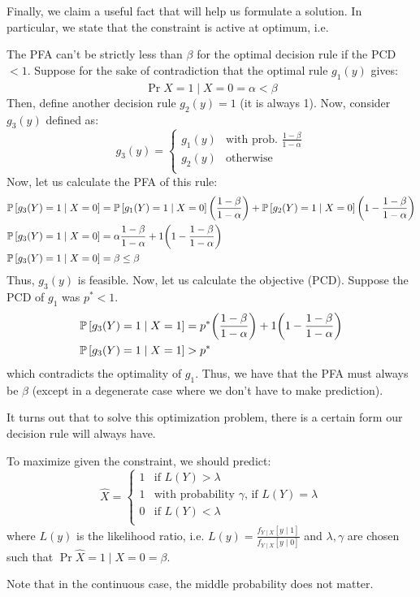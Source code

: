 Finally, we claim a useful fact that will help us formulate a solution. In particular, we state that the constraint is active at optimum, i.e.
\begin{theorem}
    The PFA can't be strictly less than $\beta$ for the optimal decision rule if the PCD $< 1$.
    Suppose for the sake of contradiction that the optimal rule $g_1(y)$ gives:
    \[ \Pr{\hat{X} = 1 \mid X = 0} = \alpha < \beta \]
    Then, define another decision rule $g_2(y) = 1$ (it is always 1). Now, consider $g_3(y)$ defined as:
    \[ g_3(y) = \begin{cases}
        g_1(y) & \text{with prob. $\frac{1 - \beta}{1 - \alpha}$} \\
        g_2(y) & \text{otherwise} \\
    \end{cases} \]
    Now, let us calculate the PFA of this rule:
    \begin{align*}
        \mathbb{P}\left[ g_3(Y) = 1 \mid X = 0 \right] &= \mathbb{P}\left[ g_1(Y) = 1 \mid X = 0 \right] \qty(\frac{1 - \beta}{1 - \alpha}) + \mathbb{P}\left[ g_2(Y) = 1 \mid X = 0 \right] \qty( 1 - \frac{1 - \beta}{1 - \alpha})\\
        \mathbb{P}\left[ g_3(Y) = 1 \mid X = 0 \right] &= \alpha \frac{1 - \beta}{1 - \alpha} + 1 \qty( 1 - \frac{1 - \beta}{1 - \alpha})\\
        \mathbb{P}\left[ g_3(Y) = 1 \mid X = 0 \right] &= \beta \leq \beta
    \end{align*}
    Thus, $g_3(y)$ is feasible. Now, let us calculate the objective (PCD). Suppose the PCD of $g_1$ was $p^* < 1$.
    \begin{align*}
        \mathbb{P}\left[ g_3(Y) = 1 \mid X = 1 \right] &= p^* \qty(\frac{1 - \beta}{1 - \alpha}) + 1 \qty(1 - \frac{1 - \beta}{1 - \alpha}) \\
        \mathbb{P}\left[ g_3(Y) = 1 \mid X = 1 \right] &> p^*
    \end{align*}
    which contradicts the optimality of $g_1$. Thus, we have that the PFA must always be $\beta$ (except in a degenerate case where we don't have to make prediction).
\end{theorem}

It turns out that to solve this optimization problem, there is a certain form our decision rule will always have.

\begin{theorem}
    To maximize given the constraint, we should predict:
    \[ \hat{X} = \begin{cases}
        1 & \text{if } L(Y) > \lambda \\
        1 & \text{with probability $\gamma$, if } L(Y) = \lambda \\
        0 & \text{if } L(Y) < \lambda \\
    \end{cases} \]
    where $L(y)$ is the likelihood ratio, i.e. $L(y) = \frac{f_{Y \mid X}[y \mid 1]}{f_{Y \mid X}[y \mid 0]}$ and $\lambda, \gamma$ are chosen
    such that $\Pr{\hat{X} = 1 \mid X = 0} = \beta$.

    Note that in the continuous case, the middle probability does not matter.
\end{theorem}

